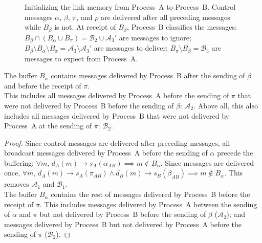 \begin{figure*}
  \begin{center}
    
    \caption{\label{fig:timelineproof}\label{fig:timeline}Initializing the link
      memory from Process~A to Process~B. Control messages $\alpha$, $\beta$,
      $\pi$, and $\rho$ are delivered after all preceding messages while
      $B_\beta$ is not. At receipt of $B_\beta$, Process~B classifies the
      messages:
      $B_\beta \cap (B_\alpha \cup B_\pi) = \mathcal{B}_2 \cup \mathcal{A}_3'$
      are messages to ignore;
      $B_\beta \setminus B_\alpha \setminus B_\pi = \mathcal{A}_3\setminus
      \mathcal{A}_3'$
      are messages to deliver; $B_\pi \setminus B_\beta = \mathcal{B}_3$ are
      messages to expect from Process~A.}
  \end{center}
\end{figure*}


  
\begin{lemma}
  The buffer $B_\alpha$ contains messages delivered by Process~B after the
  sending of $\beta$ and before the receipt of $\pi$.\\
  This includes all messages delivered by Process~A before the sending of $\pi$
  that were not delivered by Process~B before the sending of $\beta$:
  $\mathcal{A}_2$. Above all, this also includes all messages delivered
  by Process~B that were not delivered by Process~A at the sending of $\pi$:
  $\mathcal{B}_2$.
\end{lemma}

\begin{proof}
  Since control messages are delivered after preceding messages,
  all broadcast messages delivered by Process~A before the sending of $\alpha$
  precede the buffering:
  $\forall m,\, d_A(m) \rightarrow s_A(\alpha_{AB}) \implies m \not \in
  B_\alpha$.
  Since messages are delivered once,
  $\forall m,\, d_A(m) \rightarrow s_A(\pi_{AB}) \wedge d_B(m) \rightarrow
  s_B(\beta_{AB}) \implies m \not \in B_\alpha$.
  This removes $\mathcal{A}_1$ and $\mathcal{B}_1$.\\
  The buffer $B_\alpha$ contains the rest of messages delivered by Process~B
  before the receipt of $\pi$. This includes messages delivered by Process~A
  between the sending of $\alpha$ and $\pi$ but not delivered by Process~B
  before the sending of $\beta$ ($\mathcal{A}_2$); and messages delivered by
  Process~B but not delivered by Process~A before the sending of $\pi$
  ($\mathcal{B}_2$).
\end{proof}


